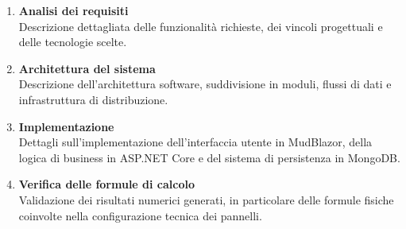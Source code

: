 \begin{enumerate}
    \item \textbf{Analisi dei requisiti} \\
    Descrizione dettagliata delle funzionalità richieste, dei vincoli progettuali e delle tecnologie scelte.

    \item \textbf{Architettura del sistema} \\
    Descrizione dell’architettura software, suddivisione in moduli, flussi di dati e infrastruttura di distribuzione.

    \item \textbf{Implementazione} \\
    Dettagli sull’implementazione dell’interfaccia utente in MudBlazor, della logica di business in ASP.NET Core e del sistema di persistenza in MongoDB.

    \item \textbf{Verifica delle formule di calcolo} \\
    Validazione dei risultati numerici generati, in particolare delle formule fisiche coinvolte nella configurazione tecnica dei pannelli.
\end{enumerate}
